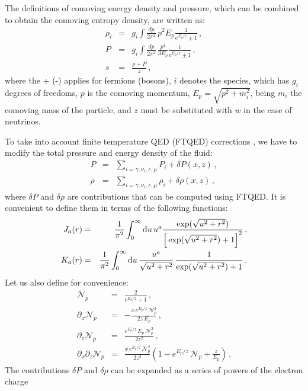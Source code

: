 \documentclass[notitlepage,nofootinbib,showpacs,preprintnumbers,amsmath,amssymb,superscriptaddress,prd,onecolumn]{revtex4-1}
\begin{document}
The definitions of comoving energy density and pressure,
which can be combined to obtain the comoving entropy density,
are written as:
\begin{eqnarray}
\rho_i
&=&
g_i
\int\frac{dp}{2\pi^2}\,
p^2 E_p \frac{1}{e^{E_p/z}\pm1}
\,,
\\
P
&=&
g_i
\int\frac{dp}{2\pi^2}\,
\frac{p^4}{3 E_p} \frac{1}{e^{E_p/z}\pm1}
\,,
\\
s
&=&
\frac{\rho+P}{z}
\,,
\end{eqnarray}
where the + (-) applies for fermions (bosons),
$i$ denotes the species, which has $g_i$ degrees of freedoms,
$p$ is the comoving momentum,
$E_p=\sqrt{p^2 + m_i^2}$, being $m_i$ the comoving mass of the particle,
and $z$ must be substituted with $w$ in the case of neutrinos.

To take into account finite temperature QED (FTQED) corrections
\cite{Fornengo:1997wa,Mangano:2001iu,Bennett:2019ewm},
we have to modify the total pressure and energy density of the fluid:
\begin{eqnarray}
P
&=&
\sum_{i=\gamma,{\nu_i},e,\mu}P_i
+
\delta P(x,z)
\,,\\
\rho
&=&
\sum_{i=\gamma,{\nu_i},e,\mu}\rho_i
+
\delta\rho(x,z)
\,,
\end{eqnarray}
where $\delta P$ and $\delta\rho$ are contributions that can be computed using FTQED.
It is convenient to define them
in terms of the following functions:
\begin{eqnarray}
J_a(r)
&=&
\frac{1}{\pi^2}
\int_0^\infty {\rm d}u \, u^a
\frac{\exp(\sqrt{u^2+r^2})}{\Big[\exp(\sqrt{u^2+r^2})+1\Big]^2}
\label{eq:j}
\,,\\
K_a(r)
&=&
\frac{1}{\pi^2}
\int_0^\infty {\rm d}u \, 
\frac{u^a}{\sqrt{u^2+r^2}}\,
\frac{1}{\exp(\sqrt{u^2+r^2})+1}
\label{eq:k}\,.
\end{eqnarray}
Let us also define for convenience:
\begin{eqnarray}
\mathcal{N}_p
&=&
\frac{2}{e^{E_p/z}+1}
\,,\\
\partial_x\mathcal{N}_p
&=&
-\frac{x\,e^{E_p/z}\,\mathcal{N}_p^2}{2z\,E_p}
\,,\\
\partial_z\mathcal{N}_p
&=&
\frac{
 e^{E_p/z}\,
 E_p\,
 \mathcal{N}_p^2
}{2 z^2}
\,,\\
\partial_x\partial_z\mathcal{N}_p
&=&
\frac{
 x\,
 e^{E_p/z}\,
 \mathcal{N}_p^2
}{2z^3}
\left(
 1
 -e^{E_p/z}\,\mathcal{N}_p
 +\frac{z}{E_p}
\right)
\,.
\end{eqnarray}
The contributions $\delta P$ and $\delta\rho$ can be expanded as a series of powers of the electron charge
\end{document}
